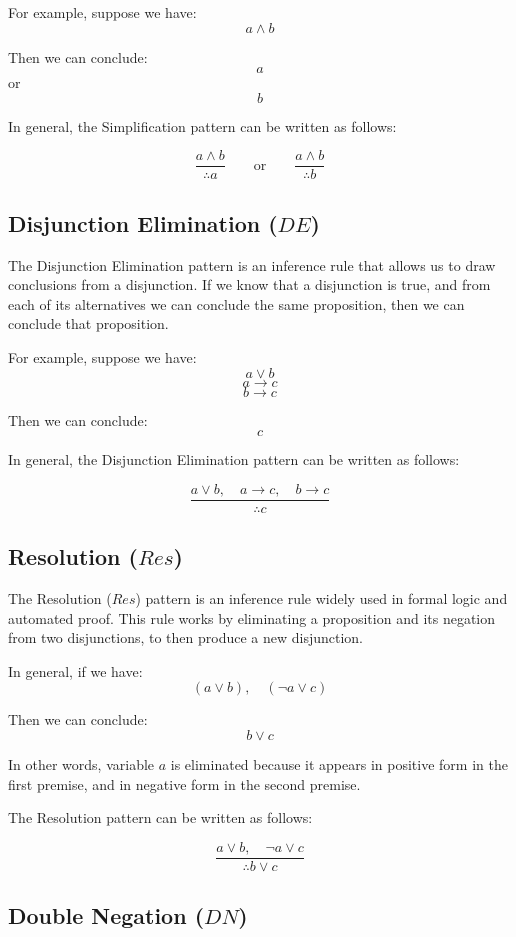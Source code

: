\documentclass[12pt,a4paper,openany]{article}
\begin{document}
For example, suppose we have:
\[a \land b\]

Then we can conclude:
\[a\]
or
\[b\]

In general, the Simplification pattern can be written as follows:

\[
\frac{a \land b}{\therefore a}
\qquad \text{or} \qquad
\frac{a \land b}{\therefore b}
\]

\subsection{Disjunction Elimination (\(DE\))}\label{disjunction-elimination-de}

The Disjunction Elimination pattern is an inference rule that allows us to draw conclusions from a disjunction. If we know that a disjunction is true, and from each of its alternatives we can conclude the same proposition, then we can conclude that proposition.

For example, suppose we have:
\[a \lor b\]
\[a \rightarrow c\]
\[b \rightarrow c\]

Then we can conclude:
\[c\]

In general, the Disjunction Elimination pattern can be written as follows:

\[
\frac{a \lor b, \quad a \rightarrow c, \quad b \rightarrow c}{\therefore c}
\]

\subsection{Resolution (\(Res\))}\label{resolution-res}

The Resolution (\(Res\)) pattern is an inference rule widely used in formal logic and automated proof. This rule works by eliminating a proposition and its negation from two disjunctions, to then produce a new disjunction.

In general, if we have:
\[(a \lor b), \quad (\lnot a \lor c)\]

Then we can conclude:
\[b \lor c\]

In other words, variable \(a\) is eliminated because it appears in positive form in the first premise, and in negative form in the second premise.

The Resolution pattern can be written as follows:

\[
\frac{a \lor b, \quad \lnot a \lor c}{\therefore b \lor c}
\]

\subsection{Double Negation (\(DN\))}\label{double-negation-dn}
\end{document}
